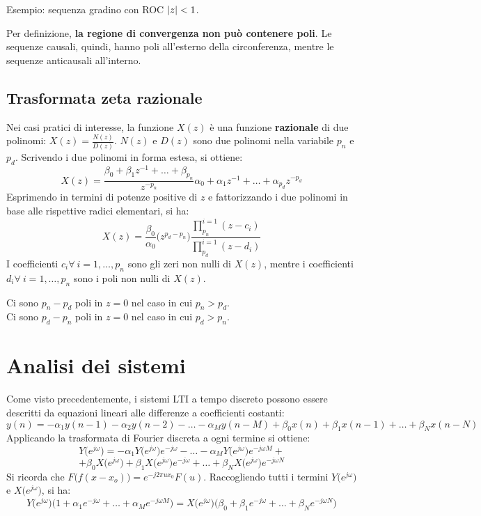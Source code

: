 Esempio: sequenza gradino con ROC $\left|z\right| < 1$.

Per definizione, \textbf{la regione di convergenza non può contenere poli}. Le sequenze causali, quindi, hanno poli all'esterno della circonferenza, mentre le sequenze anticausali all'interno.

\subsection{Trasformata zeta razionale}
Nei casi pratici di interesse, la funzione $X(z)$ è una funzione \textbf{razionale} di due polinomi: $X(z) = \frac{N(z)}{D(z)}$.
$N(z)$ e $D(z)$ sono due polinomi nella variabile $p_n$ e $p_d$. Scrivendo i due polinomi in forma estesa, si ottiene:
$$X(z) = \frac{\beta_0 + \beta_1z^{-1} + \ldots + \beta_{p_n}}{z^{-p_n}}{\alpha_0 + \alpha_1z^{-1} + \ldots + \alpha_{p_d}z^{-p_d}}$$
Esprimendo in termini di potenze positive di $z$ e fattorizzando i due polinomi in base alle rispettive radici elementari, si ha:
$$X(z) = \frac{\beta_0}{\alpha_0}\big(z^{p_d - p_n}\big) \frac{\prod_{p_n}^{i=1}(z-c_i)}{\prod_{p_d}^{i=1}(z-d_i)}$$
I coefficienti $c_i \forall\ i = 1, \dots, p_n$ sono gli zeri non nulli di $X(z)$, mentre i coefficienti $d_i \forall\ i = 1, \dots, p_n$ sono i poli non nulli di $X(z)$.

Ci sono $p_n - p_d$ poli in $z = 0$ nel caso in cui $p_n > p_d$. \\
Ci sono $p_d - p_n$ poli in $z = 0$ nel caso in cui $p_d > p_n$. 

\section{Analisi dei sistemi}
Come visto precedentemente, i sistemi LTI a tempo discreto possono essere descritti da equazioni lineari alle differenze a coefficienti costanti:
$$y(n) = -\alpha_1y(n-1) - \alpha_2y(n - 2) - \ldots - \alpha_My(n - M) + \beta_0x(n) + \beta_1x(n - 1) + \ldots + \beta_Nx(n - N)$$
Applicando la trasformata di Fourier discreta a ogni termine si ottiene:
$$Y\big(e^{j\omega}\big) = -\alpha_1Y\big(e^{j\omega}\big)e^{-j\omega} - \ldots - \alpha_MY\big(e^{j\omega}\big)e^{-j\omega M} + $$
$$ + \beta_0 X\big(e^{j\omega}\big) + \beta_1X\big(e^{j\omega}\big)e^{-j\omega} + \ldots + \beta_NX\big(e^{j\omega}\big)e^{-j\omega N}$$
Si ricorda che $F\big(f(x - x_o)\big) = e^{-j2\pi ux_0} F(u)$. Raccogliendo tutti i termini $Y\big(e^{j\omega}\big)$ e $X\big(e^{j\omega}\big)$, si ha:
$$Y\big(e^{j\omega}\big) \big(1 + \alpha_1e^{-j\omega} + \ldots + \alpha_Me^{-j\omega M}\big) = X\big(e^{j\omega}\big) \big(\beta_0 + \beta_1e^{-j\omega} + \ldots + \beta_Ne^{-j\omega N}\big)$$

